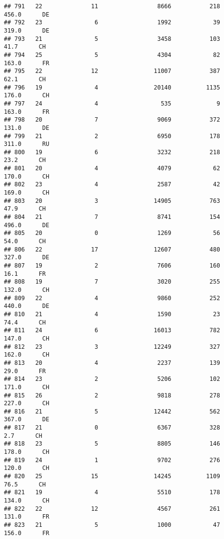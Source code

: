 \documentclass[
]{article}
\begin{document}
\begin{verbatim}
## 791   22              11                 8666           218    456.0      DE
## 792   23               6                 1992            39    319.0      DE
## 793   21               5                 3458           103     41.7      CH
## 794   25               5                 4304            82    163.0      FR
## 795   22              12                11007           387     62.1      CH
## 796   19               4                20140          1135    176.0      CH
## 797   24               4                  535             9    163.0      FR
## 798   20               7                 9069           372    131.0      DE
## 799   21               2                 6950           178    311.0      RU
## 800   19               6                 3232           218     23.2      CH
## 801   20               4                 4079            62    170.0      CH
## 802   23               4                 2587            42    169.0      CH
## 803   20               3                14905           763     47.9      CH
## 804   21               7                 8741           154    496.0      DE
## 805   20               0                 1269            56     54.0      CH
## 806   22              17                12607           480    327.0      DE
## 807   19               2                 7606           160     16.1      FR
## 808   19               7                 3020           255    132.0      CH
## 809   22               4                 9860           252    440.0      DE
## 810   21               4                 1590            23     74.4      CH
## 811   24               6                16013           782    147.0      CH
## 812   23               3                12249           327    162.0      CH
## 813   20               4                 2237           139     29.0      FR
## 814   23               2                 5206           102    171.0      CH
## 815   26               2                 9818           278    227.0      CH
## 816   21               5                12442           562    367.0      DE
## 817   21               0                 6367           328      2.7      CH
## 818   23               5                 8805           146    178.0      CH
## 819   24               1                 9702           276    120.0      CH
## 820   25              15                14245          1109     76.5      CH
## 821   19               4                 5510           178    134.0      CH
## 822   22              12                 4567           261    131.0      FR
## 823   21               5                 1000            47    156.0      FR

\end{verbatim}
\end{document}
